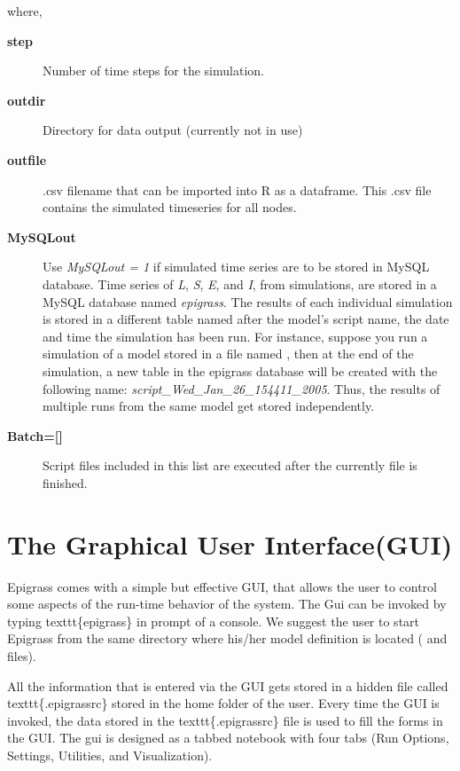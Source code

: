 \documentclass[a4paper,10pt,english]{sphinxmanual}
\begin{document}
where,
\begin{description}
\item[{\textbf{step}}] \leavevmode
Number of time steps for the simulation.

\item[{\textbf{outdir}}] \leavevmode
Directory for data output (currently not in use)

\item[{\textbf{outfile}}] \leavevmode
.csv filename that can be imported into R as a dataframe. This .csv file contains the simulated timeseries for all nodes.

\item[{\textbf{MySQLout}}] \leavevmode
Use \emph{MySQLout = 1} if simulated time series are to be stored in MySQL database. Time series of \emph{L}, \emph{S}, \emph{E}, and \emph{I}, from simulations, are stored in a MySQL database named \emph{epigrass}. The results of each individual simulation is stored in a different table named after the model's script name, the date and time the simulation has been run. For instance, suppose you run a simulation of a model stored in a file named , then at the end of the simulation, a new table in the epigrass database will be created with the following name: \emph{script\_Wed\_Jan\_26\_154411\_2005}. Thus, the results of multiple runs from the same model get stored independently.

\item[{\textbf{Batch={[}{]}}}] \leavevmode
Script files included in this list are executed after the currently file is finished.

\end{description}


\section{The Graphical User Interface(GUI)}
\label{using:the-graphical-user-interface-gui}
Epigrass comes with a simple but effective GUI, that allows the user to control some aspects of the run-time behavior of the system. The Gui can be invoked by typing texttt\{epigrass\} in prompt of a console. We suggest the user to start Epigrass from the same directory where his/her model definition is located ( and    files).

All the information that is entered via the GUI gets  stored in a hidden file called texttt\{.epigrassrc\} stored in the home folder of the user. Every time the GUI is invoked, the data stored in the texttt\{.epigrassrc\} file is used to fill the forms in the GUI. The gui is designed as a tabbed notebook with four tabs (Run Options, Settings, Utilities, and Visualization).
\end{document}
